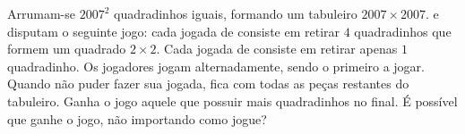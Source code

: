 Arrumam-se $2007^2$ quadradinhos iguais, formando um tabuleiro $2007 \times 2007$.
 e  disputam o seguinte jogo:
cada jogada de  consiste em retirar $4$ quadradinhos que formem um quadrado $2 \times 2$.
Cada jogada de  consiste em retirar apenas $1$ quadradinho. Os jogadores jogam alternadamente, sendo  o primeiro a jogar.
Quando  não puder fazer sua jogada,  fica com todas as peças restantes do tabuleiro.
Ganha o jogo aquele que possuir mais quadradinhos no final.
É possível que  ganhe o jogo, não importando como  jogue?
